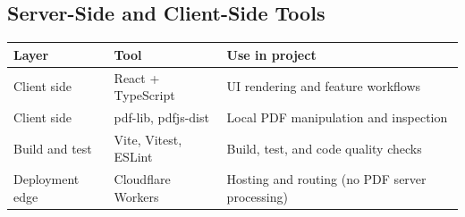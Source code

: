 \subsection{Server-Side and Client-Side Tools}
\begin{longtable}{p{}p{}p{}}
\toprule
Layer & Tool & Use in project \\
\midrule
Client side & React + TypeScript & UI rendering and feature workflows \\
Client side & pdf-lib, pdfjs-dist & Local PDF manipulation and inspection \\
Build and test & Vite, Vitest, ESLint & Build, test, and code quality checks \\
Deployment edge & Cloudflare Workers & Hosting and routing (no PDF server processing) \\
\bottomrule
\end{longtable}
